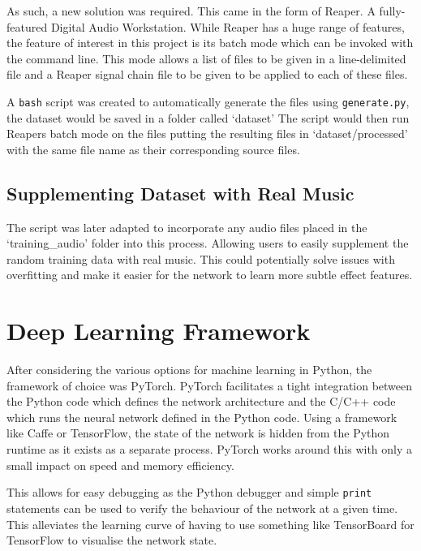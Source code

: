 \documentclass{l4proj}
\begin{document}
As such, a new solution was required. This came in the form of Reaper. A
fully-featured Digital Audio Workstation. While Reaper has a huge range
of features, the feature of interest in this project is its batch mode
which can be invoked with the command line. This mode allows a list of
files to be given in a line-delimited file and a Reaper signal chain
file to be given to be applied to each of these files.

A \texttt{bash} script was created to automatically generate the files
using \texttt{generate.py}, the dataset would be saved in a folder
called `dataset' The script would then run Reapers batch mode on the
files putting the resulting files in `dataset/processed' with the same
file name as their corresponding source files.

\hypertarget{supplementing-dataset-with-real-music}{%
\subsection{Supplementing Dataset with Real
Music}\label{supplementing-dataset-with-real-music}}

The script was later adapted to incorporate any audio files placed in
the `training\_audio' folder into this process. Allowing users to easily
supplement the random training data with real music. This could
potentially solve issues with overfitting and make it easier for the
network to learn more subtle effect features.

\hypertarget{deep-learning-framework}{%
\section{Deep Learning Framework}\label{deep-learning-framework}}

After considering the various options for machine learning in Python,
the framework of choice was PyTorch. PyTorch facilitates a tight
integration between the Python code which defines the network
architecture and the C/C++ code which runs the neural network defined in
the Python code. Using a framework like Caffe or TensorFlow, the state
of the network is hidden from the Python runtime as it exists as a
separate process. PyTorch works around this with only a small impact on
speed and memory efficiency.

This allows for easy debugging as the Python debugger and simple
\texttt{print} statements can be used to verify the behaviour of the
network at a given time. This alleviates the learning curve of having to
use something like TensorBoard for TensorFlow to visualise the network
state.
\end{document}
